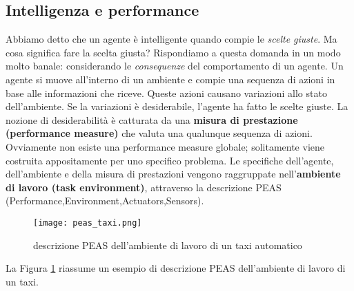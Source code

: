  \subsection{Intelligenza e performance}
 Abbiamo detto che un agente è intelligente quando compie le \emph{scelte giuste}. Ma cosa significa fare la scelta giusta?
 Rispondiamo a questa domanda in un modo molto banale: considerando le \emph{consequenze} del comportamento di un agente.
 Un agente si muove all'interno di un ambiente e compie una sequenza di azioni in base alle informazioni che riceve.
 Queste azioni causano variazioni allo stato dell'ambiente. Se la variazioni è desiderabile, l'agente ha fatto le scelte giuste.
 La nozione di desiderabilità è catturata da una \textbf{misura di prestazione (performance measure)} che valuta una qualunque sequenza di azioni.
 Ovviamente non esiste una performance measure globale; solitamente viene costruita appositamente  per uno specifico problema.
 Le specifiche dell'agente, dell'ambiente e della misura di prestazioni vengono raggruppate nell'\textbf{ambiente di lavoro (task environment)},
 attraverso la descrizione PEAS (Performance,Environment,Actuators,Sensors)\cite{aima}.
 \begin{figure}
  \texttt{[image: peas\_taxi.png]}
  \caption{descrizione PEAS dell'ambiente di lavoro di un taxi automatico\cite{aima}}
  \label{fig:taxi}
 \end{figure}
 La Figura \ref{fig:taxi} riassume un esempio di descrizione PEAS dell'ambiente di lavoro di un taxi.
